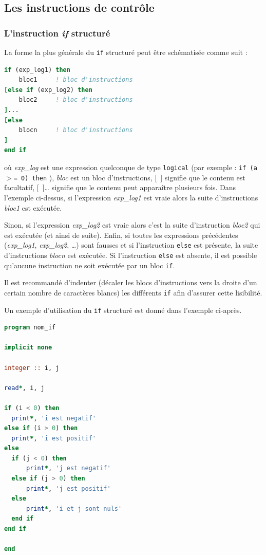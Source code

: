 \documentclass[a4paper,twoside]{article}
\begin{document}
\subsection{Les instructions de contrôle}
\subsubsection{L'instruction \emph{if} structuré}

La forme la plus générale du \texttt{if} structuré peut être 
schématisée comme suit :
\begin{lstlisting}[language=Fortran]
if (exp_log1) then
    bloc1     ! bloc d'instructions 
[else if (exp_log2) then 
    bloc2     ! bloc d'instructions 
]...
[else
    blocn     ! bloc d'instructions 
] 
end if
\end{lstlisting}
où \emph{exp\_log} est une expression quelconque de type \texttt{logical} (par exemple : \texttt{if (a $>$= 0) then} ), \emph{bloc} est un bloc d'instruc\-tions, \mbox{[ ]} signifie que le contenu est facultatif, \mbox{[ ]\ldots} signifie que le contenu peut apparaître plusieurs fois. Dans l'exemple ci-dessus, si l'expression \emph{exp\_log1} est vraie alors la suite d'instruc\-tions \emph{bloc1} est exécutée. 

Sinon, si l'expression \emph{exp\_log2} est vraie alors c'est la suite d'instruction \emph{bloc2} qui est exécutée (et ainsi de suite). Enfin, si toutes les expressions précédentes (\emph{exp\_log1}, \emph{exp\_log2}, \ldots) sont fausses et si l'instruction \texttt{else} est présente, la suite d'instructions \emph{blocn} est exécutée. Si l'instruc\-tion \texttt{else} est absente, il est possible qu'aucune instruction ne soit exécutée par un bloc \texttt{if}.

\begin{remarque}
Il est recommandé d'indenter (décaler les blocs d'instructions vers la droite d'un certain nombre de caractères blancs) les différents \texttt{if} afin d'assurer cette lisibilité. 
\end{remarque}



Un exemple d'utilisation du \texttt{if} structuré est donné dans l'exemple ci-après. 
\begin{lstlisting}[language=Fortran]
program nom_if

implicit none

integer :: i, j

read*, i, j

if (i < 0) then
  print*, 'i est negatif'
else if (i > 0) then
  print*, 'i est positif'
else
  if (j < 0) then
      print*, 'j est negatif'
  else if (j > 0) then
      print*, 'j est positif'
  else
      print*, 'i et j sont nuls'
  end if
end if

end
\end{lstlisting}
\end{document}
